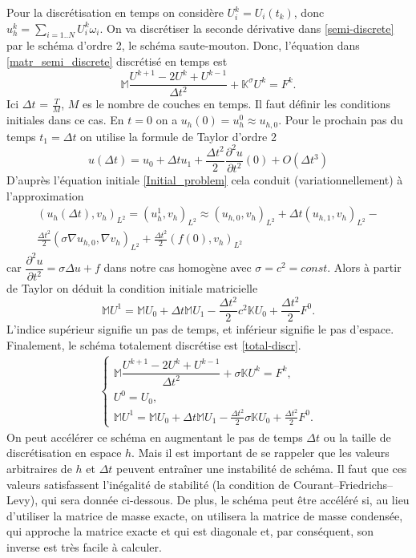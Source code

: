 \documentclass[12pt]{article}
\begin{document}
Pour la discrétisation en temps on considère $U_i^k = U_i(t_k)$, donc\\ $u_h^k = \sum_{i = 1..N}U_i^k\omega_i$. On va discrétiser la seconde dérivative dans \eqref{semi-discrete} par le schéma d'ordre 2, le schéma saute-mouton. Donc, l'équation dans \eqref{matr_semi_discrete} discrétisé en temps est
\begin{equation*}
\mathbb{M}\dfrac{U^{k+1} - 2U^k + U^{k - 1}}{\Delta t^2} + \mathbb{K}^\sigma U^k = F^k.
\end{equation*}
Ici $\Delta t $ = $\frac{T}{M}$, $M$ es le nombre de couches en temps.
Il faut définir les conditions initiales dans ce cas. En $t = 0$ on a $u_h(0) = u_h^0 \approx u_{h,0}$. Pour le prochain pas du temps $t_1 = \Delta t$ on utilise la formule de Taylor d’ordre 2
\begin{equation*}
u(\Delta t) = u_0 + \Delta t u_1 + \frac{\Delta t^2}{2}\frac{\partial^2u}{\partial t^2}(0) + O(\Delta t^3)
\end{equation*}
D'auprès l'équation initiale \eqref{Initial_problem} cela conduit (variationnellement) à l'approximation 
\begin{multline*}
	(u_h(\Delta t), v_h)_{L^2} = (u_h^1, v_h)_{L^2} \approx (u_{h,0}, v_h)_{L^2} + \Delta t(u_{h,1},v_h)_{L^2} -\\ \frac{\Delta t^2}{2}(\sigma \nabla u_{h,0}, \nabla v_h)_{L^2} + \frac{\Delta t^2}{2} (f(0), v_h)_{L^2}
\end{multline*}
car $\dfrac{\partial^2u}{\partial t^2} = \sigma \Delta u + f$ dans notre cas homogène avec $\sigma = c^2 = const$.
Alors à partir de Taylor on déduit la condition initiale matricielle
\begin{equation*}
	\mathbb{M}U^1 = \mathbb{M}U_0 + \Delta t\mathbb{M}U_1 - \frac{\Delta t^2}{2}c^2\mathbb{K}U_0 +  \frac{\Delta t^2}{2}F^0.
\end{equation*}
L'indice supérieur signifie un pas de temps, et inférieur signifie le pas d'espace. Finalement, le schéma totalement discrétise est \eqref{total-discr}.
\begin{eqnarray}
\label{total-discr}
\begin{cases}
\mathbb{M}\dfrac{U^{k+1} - 2U^k + U^{k - 1}}{\Delta t^2} +\sigma \mathbb{K} U^k = F^k,\\
U^0 = U_0,\\
\mathbb{M}U^1 = \mathbb{M}U_0 + \Delta t\mathbb{M}U_1 - \frac{\Delta t^2}{2}\sigma \mathbb{K}U_0 +  \frac{\Delta t^2}{2}F^0.
\end{cases}
\end{eqnarray}
On peut accélérer ce schéma en augmentant le pas de temps $\Delta t$ ou la taille de discrétisation en espace $h$. Mais il est important de se rappeler que les valeurs arbitraires de $h$ et $\Delta t$ peuvent entraîner une instabilité de schéma. Il faut que ces valeurs satisfassent l'inégalité de stabilité (la condition de Courant–Friedrichs–Levy), qui sera donnée ci-dessous. De plus, le schéma peut être accéléré si, au lieu d'utiliser la matrice de masse exacte, on utilisera la matrice de masse condensée, qui approche la matrice exacte et qui est diagonale et, par conséquent, son inverse est très facile à calculer.
\end{document}
